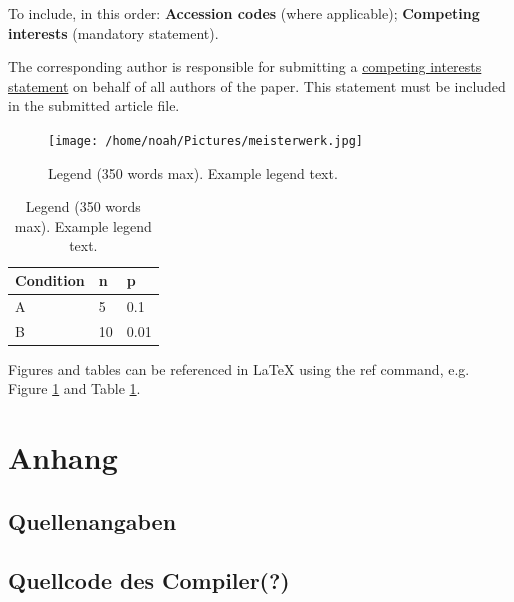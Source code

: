 \documentclass[12pt, a4paper, oneside, ngerman]{article}
\begin{document}
To include, in this order: \textbf{Accession codes} (where applicable); \textbf{Competing interests} (mandatory statement).

The corresponding author is responsible for submitting a \href{http://www.nature.com/srep/policies/index.html#competing}{competing interests statement} on behalf of all authors of the paper. This statement must be included in the submitted article file.

\begin{figure}[ht]
\centering
\texttt{[image: /home/noah/Pictures/meisterwerk.jpg]}
\caption{Legend (350 words max). Example legend text.}
\label{fig:stream}
\end{figure}

\begin{table}[ht]
\centering
\begin{tabular}{|l|l|l|}
\hline
Condition & n & p \\
\hline
A & 5 & 0.1 \\
\hline
B & 10 & 0.01 \\
\hline
\end{tabular}
\caption{\label{tab:example}Legend (350 words max). Example legend text.}
\end{table}

Figures and tables can be referenced in LaTeX using the ref command, e.g. Figure \ref{fig:stream} and Table \ref{tab:example}.


\section{Anhang}
\subsection{Quellenangaben}

\subsection{Quellcode des Compiler(?)}
\end{document}
